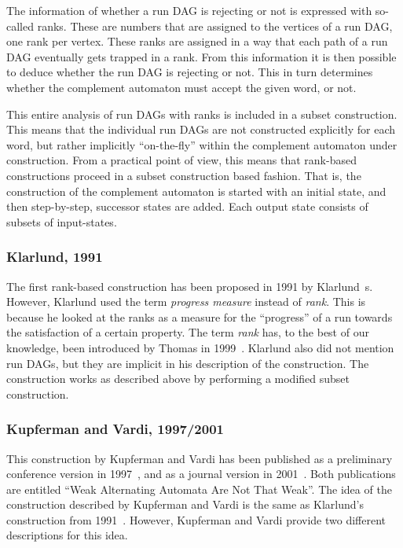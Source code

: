The information of whether a run DAG is rejecting or not is expressed with so-called ranks. These are numbers that are assigned to the vertices of a run DAG, one rank per vertex. These ranks are assigned in a way that each path of a run DAG eventually gets trapped in a rank. From this information it is then possible to deduce whether the run DAG is rejecting or not. This in turn determines whether the complement automaton must accept the given word, or not.

This entire analysis of run DAGs with ranks is included in a subset construction. This means that the individual run DAGs are not constructed explicitly for each word, but rather implicitly ``on-the-fly'' within the complement automaton under construction. From a practical point of view, this means that rank-based constructions proceed in a subset construction based fashion. That is, the construction of the complement automaton is started with an initial state, and then step-by-step, successor states are added. Each output state consists of subsets of input-states.

\subsubsection{Klarlund, 1991}
\label{2_kla91}
The first rank-based construction has been proposed in 1991 by Klarlund~s. However, Klarlund used the term \textit{progress measure} instead of \textit{rank}. This is because he looked at the ranks as a measure for the ``progress'' of a run towards the satisfaction of a certain property. The term \textit{rank} has, to the best of our knowledge, been introduced by Thomas in 1999~\cite{1999_thomas}. Klarlund also did not mention run DAGs, but they are implicit in his description of the construction. The construction works as described above by performing a modified subset construction. 

\subsubsection{Kupferman and Vardi, 1997/2001}
\label{2_kv01}
This construction by Kupferman and Vardi has been published as a preliminary conference version in 1997~\cite{1997_vardi}, and as a journal version in 2001~\cite{Kupferman:2001}. Both publications are entitled ``Weak Alternating Automata Are Not That Weak''. The idea of the construction described by Kupferman and Vardi is the same as Klarlund's construction from 1991~\cite{1991_klarlund}. However, Kupferman and Vardi provide two different descriptions for this idea.

